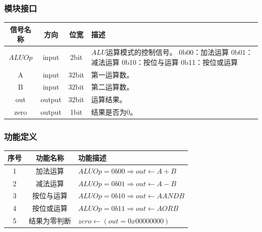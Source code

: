 \documentclass[main.tex]{subfiles}
\begin{document}
\subsubsection{模块接口}
\begin{center}
    \begin{tabular}{c c c l}
        \toprule
        信号名称 & 方向 & 位宽 & 描述 \\
        \midrule
        $ALUOp$ & input & 2bit & \makecell[lt]{
            $ALU$运算模式的控制信号。\\
            0b00：加法运算\\
            0b01：减法运算\\
            0b10：按位与运算 \\
            0b11：按位或运算
        } \\
        \midrule
        A & input & 32bit & 第一运算数。 \\
        B & input & 32bit & 第二运算数。 \\
        out & output & 32bit & 运算结果。 \\
        zero & output & 1bit & 结果是否为0。 \\
        \bottomrule
    \end{tabular}
\end{center}

\subsubsection{功能定义}
\begin{center}
    \begin{tabular}{c c l}
        \toprule
        序号 & 功能名称 & 功能描述 \\
        \midrule
        1 & 加法运算 & $ALUOp = 0b00 \Rightarrow out \leftarrow A+B$ \\
        2 & 减法运算 & $ALUOp = 0b01 \Rightarrow out \leftarrow A-B$ \\
        3 & 按位与运算 & $ALUOp = 0b10 \Rightarrow out \leftarrow A AND B$ \\
        4 & 按位或运算 & $ALUOp = 0b11 \Rightarrow out \leftarrow A OR B$ \\
        5 & 结果为零判断 & $zero \leftarrow \left( out = 0x00000000 \right) $ \\
        \bottomrule
    \end{tabular}
\end{center}
\end{document}
